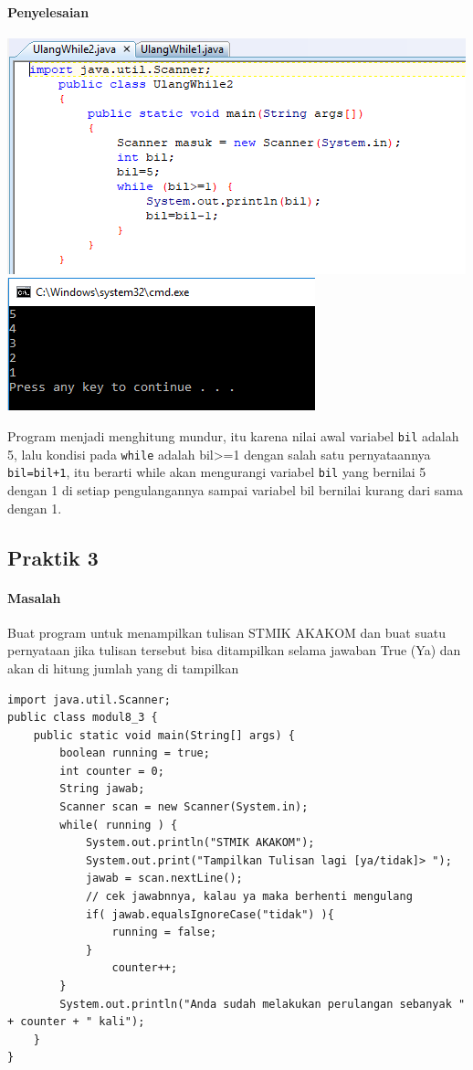 \documentclass[a4paper,12pt]{article}
\begin{document}
\paragraph{Penyelesaian\\}
\begin{center}
	\includegraphics[width=\linewidth]{Capture4}
	\includegraphics[scale=1]{Capture5}
\end{center}
Program menjadi menghitung mundur, itu karena nilai awal variabel \texttt{bil} adalah 5, lalu kondisi pada \texttt{while} adalah bil>=1 dengan salah satu pernyataannya \texttt{bil=bil+1}, itu berarti while akan mengurangi variabel \texttt{bil} yang bernilai 5 dengan 1 di setiap pengulangannya sampai variabel bil bernilai kurang dari sama dengan 1. 

\subsection{Praktik 3}
\paragraph{Masalah\\}
Buat program untuk menampilkan tulisan STMIK AKAKOM dan buat suatu
pernyataan jika tulisan tersebut bisa ditampilkan selama jawaban True (Ya) dan akan
di hitung jumlah yang di tampilkan
\begin{lstlisting}[frame=single, basicstyle=\small]
import java.util.Scanner;
public class modul8_3 {
    public static void main(String[] args) {
        boolean running = true;
        int counter = 0;
        String jawab;
        Scanner scan = new Scanner(System.in);
        while( running ) {
            System.out.println("STMIK AKAKOM");
            System.out.print("Tampilkan Tulisan lagi [ya/tidak]> ");
            jawab = scan.nextLine();
            // cek jawabnnya, kalau ya maka berhenti mengulang
            if( jawab.equalsIgnoreCase("tidak") ){
                running = false;
            }
                counter++;
        }
        System.out.println("Anda sudah melakukan perulangan sebanyak " + counter + " kali");
    }
}
\end{lstlisting}
\end{document}
